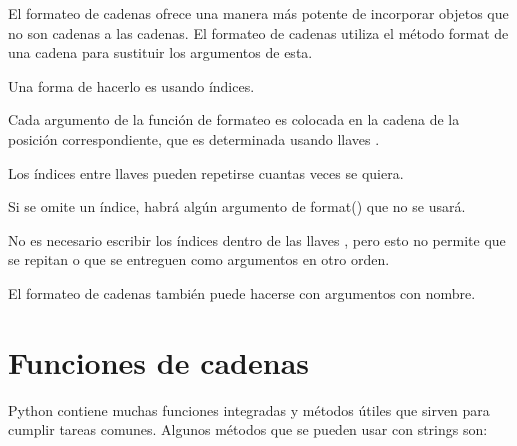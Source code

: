 \documentclass{report}
\begin{document}
El formateo de cadenas ofrece una manera más potente de incorporar objetos que no son cadenas a las cadenas. El formateo de cadenas utiliza el método format de una cadena para sustituir los argumentos de esta.\smallskip

Una forma de hacerlo es usando índices.


Cada argumento de la función de formateo es colocada en la cadena de la posición correspondiente, que es determinada usando llaves {}.\smallskip

Los índices entre llaves {} pueden repetirse cuantas veces se quiera.


Si se omite un índice, habrá algún argumento de format() que no se usará.


No es necesario escribir los índices dentro de las llaves {}, pero esto no permite que se repitan o que se entreguen como argumentos en otro orden.


El formateo de cadenas también puede hacerse con argumentos con nombre.


\section{Funciones de cadenas}

Python contiene muchas funciones integradas y métodos útiles que sirven para cumplir tareas comunes. Algunos métodos que se pueden usar con strings son:
\end{document}
